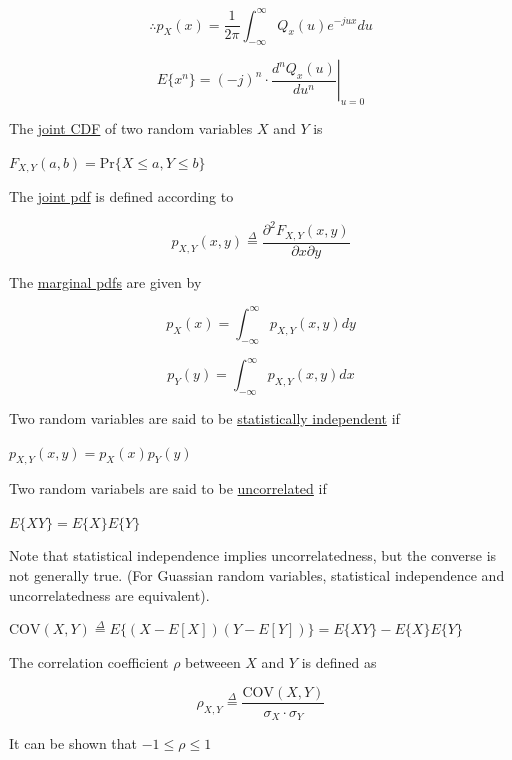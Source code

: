 \documentclass[fleqn]{article}
\begin{document}
	\begin{equation*}
		\therefore p_X(x) = \frac{1}{2\pi}\int_{-\infty}^{\infty}{Q_x(u)e^{-jux}du}
	\end{equation*}
	
	\begin{equation*}
		E\{x^n\} = (-j)^n\cdot\left.\frac{d^nQ_x(u)}{du^n}\right\vert_{u=0}
	\end{equation*}
	
	The \underline{joint CDF} of two random variables $X$ and $Y$ is
	
	$F_{X,Y}(a,b) = \text{Pr}\{X \leq a, Y \leq b\}$
	
	The \underline{joint pdf} is defined according to
	
	\begin{equation*}
		p_{X,Y}(x,y) \overset{\Delta}{=} \frac{\partial^2F_{X,Y}(x,y)}{\partial{x}\partial{y}}
	\end{equation*}
	
	The \underline{marginal pdfs} are given by
	
	\begin{equation*}
		p_X(x) = \int_{-\infty}^{\infty}p_{X,Y}(x,y)dy
	\end{equation*}
	
	\begin{equation*}
		p_Y(y) = \int_{-\infty}^{\infty}p_{X,Y}(x,y)dx
	\end{equation*}
	
	Two random variables are said to be \underline{statistically independent} if
	
	$p_{X,Y}(x,y) = p_X(x)p_Y(y)$
	
	Two random variabels are said to be \underline{uncorrelated} if
	
	$E\{XY\} = E\{X\}E\{Y\}$
	
	Note that statistical independence implies uncorrelatedness, but the converse is not generally true. (For Guassian random variables, statistical independence and uncorrelatedness are equivalent).
	
	$\text{COV}(X,Y) \overset{\Delta}{=} E\{(X-E[X])(Y-E[Y]) \} = E\{XY\} - E\{X\}E\{Y\}$
	
	The correlation coefficient $\rho$ betweeen $X$ and $Y$ is defined as
	
	\begin{equation*}
		\rho_{X,Y} \overset{\Delta}{=} \frac{\text{COV}(X,Y)}{\sigma_X\cdot\sigma_Y}
	\end{equation*}
	
	It can be shown that $-1 \leq \rho \leq 1$
	
\end{document}
